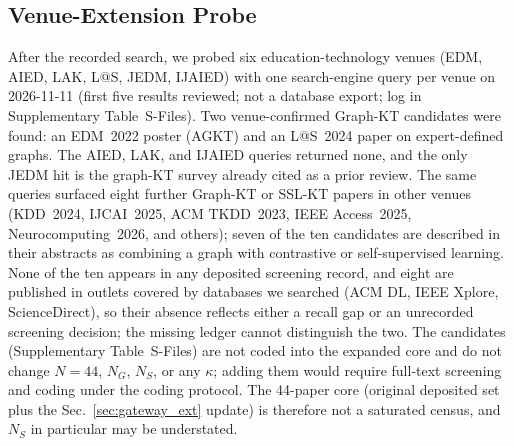 \documentclass[lettersize,journal]{IEEEtran}
\begin{document}
\subsection{Venue-Extension Probe}
\label{sec:venue_ext}
After the recorded search, we probed six education-technology venues (EDM, AIED, LAK, L@S, JEDM, IJAIED) with one search-engine query per venue on 2026-11-11 (first five results reviewed; not a database export; log in Supplementary Table~S-Files). Two venue-confirmed Graph-KT candidates were found: an EDM~2022 poster (AGKT) and an L@S~2024 paper on expert-defined graphs. The AIED, LAK, and IJAIED queries returned none, and the only JEDM hit is the graph-KT survey already cited as a prior review. The same queries surfaced eight further Graph-KT or SSL-KT papers in other venues (KDD~2024, IJCAI~2025, ACM TKDD~2023, IEEE Access~2025, Neurocomputing~2026, and others); seven of the ten candidates are described in their abstracts as combining a graph with contrastive or self-supervised learning. None of the ten appears in any deposited screening record, and eight are published in outlets covered by databases we searched (ACM DL, IEEE Xplore, ScienceDirect), so their absence reflects either a recall gap or an unrecorded screening decision; the missing ledger cannot distinguish the two. The candidates (Supplementary Table~S-Files) are not coded into the expanded core and do not change $N=44$, $N_G$, $N_S$, or any $\kappa$; adding them would require full-text screening and coding under the coding protocol. The 44-paper core (original deposited set plus the Sec.~\ref{sec:gateway_ext} update) is therefore not a saturated census, and $N_S$ in particular may be understated.
\end{document}
